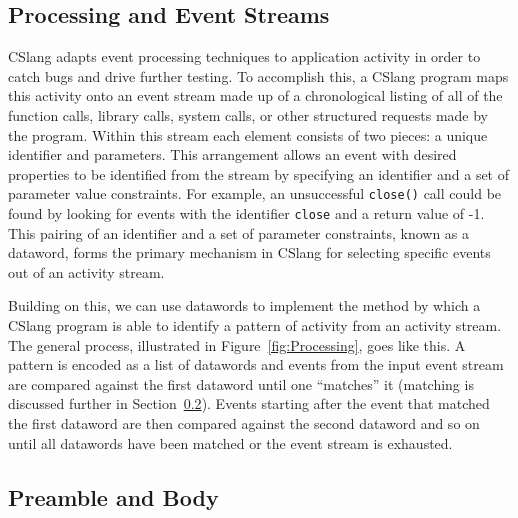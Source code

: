 \subsection{Processing and Event Streams}
\label{sub:ProcessingEventStreams}
CSlang adapts event processing
techniques to application activity in order to catch bugs and drive further
testing.  To accomplish this, a CSlang program maps this activity onto an
event stream
made up of a chronological listing of all of the function calls, library
calls, system calls, or other structured requests made by the program.
Within this stream each element consists of two pieces: a unique
identifier and parameters.
This arrangement allows an event with desired properties to be identified
from the stream by specifying an identifier and a set of parameter value
constraints.  For example, an unsuccessful {\tt close()} call could be
found by looking for events with the identifier {\tt close} and a return
value of -1.  This pairing of an identifier and a set of parameter
constraints, known as a dataword, forms the primary mechanism in CSlang for
selecting specific events out of an activity stream.

Building on this, we can use datawords to implement the method by which
a CSlang program is able to
identify a  pattern of activity from an activity stream.
The general process, illustrated in Figure~\ref{fig:Processing}, goes like
this.  A pattern is encoded as a list of datawords and events from the
input event stream are compared against the first dataword until one
``matches'' it (matching is discussed further in
Section~\ref{sub:PreambleAndBody}).  Events starting after the event that
matched the first dataword are then compared against the second dataword
and so on until all datawords have been matched or the event stream is
exhausted.


%
%


\subsection{Preamble and Body}
\label{sub:PreambleAndBody}


